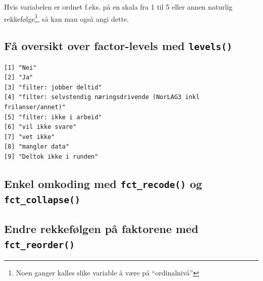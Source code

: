 \documentclass[
  letterpaper,
  DIV=11,
  numbers=noendperiod]{scrreprt}
\newenvironment{Shaded}{\begin{snugshade}}{\end{snugshade}}
\newcommand{\FunctionTok}[1]{\textcolor[rgb]{0.28,0.35,0.67}{#1}}
\newcommand{\NormalTok}[1]{\textcolor[rgb]{0.00,0.23,0.31}{#1}}
\newcommand{\SpecialCharTok}[1]{\textcolor[rgb]{0.37,0.37,0.37}{#1}}
\theoremstyle{definition}
\theoremstyle{remark}
\begin{document}
Hvis variabelen er ordnet f.eks. på en skala fra 1 til 5 eller annen
naturlig rekkefølge\footnote{Noen ganger kalles slike variable å være på
  ``ordinalnivå''}, så kan man også angi dette.

\hypertarget{fuxe5-oversikt-over-factor-levels-med-levels}{%
\subsection{\texorpdfstring{Få oversikt over factor-levels med
\texttt{levels()}}{Få oversikt over factor-levels med levels()}}\label{fuxe5-oversikt-over-factor-levels-med-levels}}

\begin{Shaded}
\end{Shaded}

\begin{verbatim}
[1] "Nei"                                                               
[2] "Ja"                                                                
[3] "filter: jobber deltid"                                             
[4] "filter: selvstendig næringsdrivende (NorLAG3 inkl frilanser/annet)"
[5] "filter: ikke i arbeid"                                             
[6] "vil ikke svare"                                                    
[7] "vet ikke"                                                          
[8] "mangler data"                                                      
[9] "Deltok ikke i runden"                                              
\end{verbatim}

\hypertarget{enkel-omkoding-med-fct_recode-og-fct_collapse}{%
\subsection{\texorpdfstring{Enkel omkoding med \texttt{fct\_recode()} og
\texttt{fct\_collapse()}}{Enkel omkoding med fct\_recode() og fct\_collapse()}}\label{enkel-omkoding-med-fct_recode-og-fct_collapse}}

\hypertarget{endre-rekkefuxf8lgen-puxe5-faktorene-med-fct_reorder}{%
\subsection{\texorpdfstring{Endre rekkefølgen på faktorene med
\texttt{fct\_reorder()}}{Endre rekkefølgen på faktorene med fct\_reorder()}}\label{endre-rekkefuxf8lgen-puxe5-faktorene-med-fct_reorder}}
\end{document}

